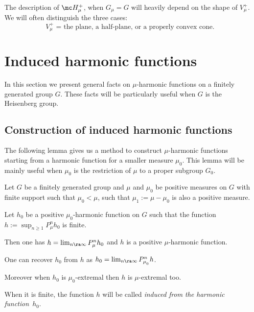 The description of $\mc H_\mu^+$, when $G_\mu=G$ will heavily depend on the shape of $V^+_\mu$.
We will often distinguish the three cases:
\begin{equation}
\label{eqnvmuphc}
\mbox{ $V^+_\mu$ = the plane, a half-plane, or a properly convex cone.}
\end{equation}

\section{Induced harmonic functions}
\label{secproof}

In this section we present general facts on $\mu$-harmonic functions
on a finitely generated group $G$. These facts will be particularly useful
when $G$ is the Heisenberg group.

\subsection{Construction of induced harmonic functions}
\label{secconind}

\bq
The following lemma gives us a method to construct
$\mu$-harmonic functions starting from a harmonic function
for a smaller measure $\mu_0$.
This lemma will be mainly useful when $\mu_0$ is the restriction of $\mu$
to a proper subgroup $G_0$.
\eq

Let $G$ be a finitely generated group and
$\mu$ and $\mu_0$ be positive measures on $G$ with finite support
such that $\mu_0 <\mu$, \ie such that $\mu_1:=\mu-\mu_0$ is also a positive measure.

\begin{Lem}
\label{lemconind}
Let $h_0$ be a positive $\mu_0$-harmonic function on $G$ such that
the function $h:=\sup_{n\geq 1}P^n_{\mu}h_0$ is finite.
\begin{enumeratei}
\item\label{lemconindi}
Then
one has
$h=\lim_{n\ra\infty}P^n_{\mu}h_0$ and
$h$ is a positive $\mu$-harmonic function.
\item\label{lemconindii}
One can recover $h_0$ from $h$ as
$h_0=\lim_{n\ra\infty}P^n_{\mu_{_0}}h$.
\item\label{lemconindiii}
Moreover when $h_0$ is $\mu_0$-extremal then $h$ is $\mu$-extremal too.
\end{enumeratei}
\end{Lem}

When it is finite, the function $h$ will be called \emph{induced from the harmonic function~$h_0$}.

